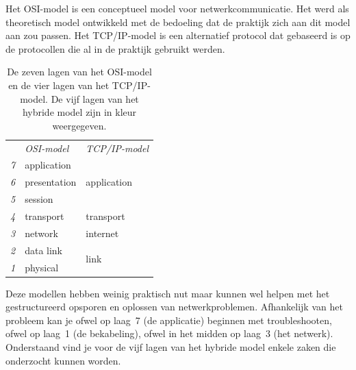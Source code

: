 Het OSI-model is een conceptueel model voor netwerkcommunicatie.
Het werd als theoretisch model ontwikkeld met de bedoeling dat de praktijk zich aan dit model aan zou passen.
Het TCP/IP-model is een alternatief protocol dat gebaseerd is op de protocollen die al in de praktijk gebruikt werden.

\begin{table}[htp]
   \centering
   \begin{tabular}{rll}
     & \textit{OSI-model} & \textit{TCP/IP-model} \\[1ex]
   \textit{7} & application & \multirow{3}{*}{\textcolor{spot1}{application}} \\
   \textit{6} & presentation & \\
   \textit{5} & session & \\[1ex]
   \textit{4} & \textcolor{spot1}{transport} & transport \\[1ex]
   \textit{3} & \textcolor{spot1}{network} & internet \\[1ex]
   \textit{2} & \textcolor{spot1}{data link} & \multirow{2}{*}{link} \\
   \textit{1} & \textcolor{spot1}{physical} & \\
   \end{tabular}
   \caption{De zeven lagen van het OSI-model en de vier lagen van het TCP/IP-model.
   De vijf lagen van het hybride model zijn in kleur weergegeven.}
   \label{tab:osi-model}
\end{table}

Deze modellen hebben weinig praktisch nut maar kunnen wel helpen met het gestructureerd opsporen en oplossen van netwerkproblemen.
Afhankelijk van het probleem kan je ofwel op laag~7 (de applicatie) beginnen met troubleshooten, ofwel op laag~1 (de bekabeling), ofwel in het midden op laag~3 (het netwerk).
Onderstaand vind je voor de vijf lagen van het hybride model enkele zaken die onderzocht kunnen worden.

